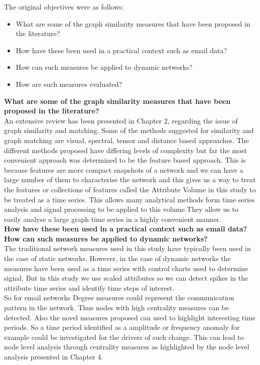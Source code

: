 The original objectives were as follows:

\begin{itemize}
    
    \item What are some of the graph similarity measures that have been proposed in the literature?
    \item How have these been used in a practical context such as email data?
    \item How can such measures be applied to dynamic networks?
    \item How are such measures evaluated?
 \end{itemize}

\textbf{What are some of the graph similarity measures that have been proposed in the literature?}\\

An extensive review has been presented in Chapter 2, regarding the issue of graph similarity and matching. Some of the methods suggested for similarity and graph matching are visual, spectral, tensor and distance based approaches. The different methods proposed have differing levels of complexity but far the most convenient approach was determined to be the feature based approach. This is because features are more compact snapshots of a network and we can have a large number of them to characterise the network and this gives us a way to treat the features or collections of features called the Attribute Volume in this study to be treated as a time series. This allows many analytical methods form time series analysis and signal processing to be applied to this volume.They allow us to easily analyse a large graph time series in a highly convenient manner. \\

\textbf{How have these been used in a practical context such as email data? How can such measures be applied to dynamic networks?}\\

The traditional network measures used in this study have typically been used in the case of static networks. However, in the case of dynamic networks the measures have been used as a time series with control charts used to determine signal. But in this study we use scaled attributes so we can detect spikes in the attribute time series and identify time steps of interest. \\

So for email networks Degree measures could represent the communication pattern in the network. Thus nodes with high centrality measures can be detected. Also the novel measures proposed can used to highlight interesting time periods. So a time period identified as a amplitude or frequency anomaly for example could be investigated for the drivers of such change. This can lead to node level analysis through centrality measures as highlighted by the node level analysis presented in Chapter 4. \\

